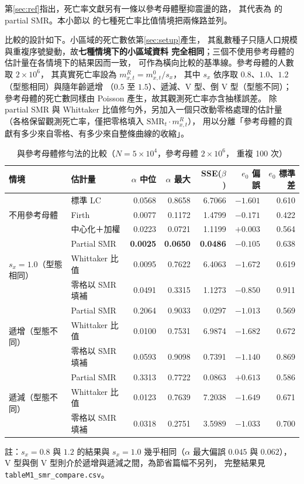 \documentclass[UTF8, fontset=macnew, a4paper, 12pt]{ctexart}
\begin{document}
第\ref{sec:ref}指出，死亡率文獻另有一條以參考母體壓抑震盪的路，
其代表為 \citet{lee2003}的 partial SMR。本小節以 \citet[Figure 2]{yue2019}
的七種死亡率比值情境把兩條路並列。

比較的設計如下。小區域的死亡數依第\ref{sec:setup}產生，
其亂數種子只隨人口規模與重複序號變動，故\textbf{七種情境下的小區域資料
完全相同}；三個不使用參考母體的估計量在各情境下的結果因而一致，
可作為橫向比較的基準線。參考母體的人數取 $2\times10^{6}$，
其真實死亡率設為 $m^{R}_{x,t}=m^{0}_{x,t}/s_x$，
其中 $s_x$ 依序取 $0.8$、$1.0$、$1.2$（型態相同）與隨年齡遞增
（$0.5$ 至 $1.5$）、遞減、V 型、倒 V 型（型態不同）；
參考母體的死亡數同樣由 Poisson 產生，故其觀測死亡率亦含抽樣誤差。
除 partial SMR 與 Whittaker 比值修勻外，另加入一個只改動零格處理的估計量
（各格保留觀測死亡率，僅把零格填入 $\mathrm{SMR}_t\cdot m^{R}_{x,t}$），
用以分離「參考母體的貢獻有多少來自零格、有多少來自整條曲線的收縮」。

\begin{table}[H]
\centering
\caption{與參考母體修勻法的比較（$N=5\times10^4$，參考母體 $2\times10^6$，
重複 100 次）}
\small
\renewcommand{\arraystretch}{1.1}
\begin{tabular}{llrrrrr}
\toprule
情境 & 估計量 & $\alpha$ 中位 & $\alpha$ 最大 & SSE($\beta$) & $e_0$ 偏誤 & $e_0$ 標準差\\
\midrule
\multirow{3}{*}{不用參考母體}
 & 標準 LC        & 0.0568 & 0.8658 & 6.7066 & $-1.601$ & 0.610\\
 & Firth          & 0.0077 & 0.1172 & 1.4799 & $-0.171$ & 0.422\\
 & 中心化＋加權   & 0.0223 & 0.0721 & 1.1199 & $+0.003$ & 0.564\\
\midrule
\multirow{3}{*}{$s_x=1.0$（型態相同）}
 & Partial SMR    & \textbf{0.0025} & \textbf{0.0650} & \textbf{0.0486} & $-0.105$ & 0.638\\
 & Whittaker 比值 & 0.0095 & 0.7622 & 6.4063 & $-1.672$ & 0.619\\
 & 零格以 SMR 填補 & 0.0491 & 0.3315 & 1.1273 & $-0.850$ & 0.911\\
\midrule
\multirow{3}{*}{遞增（型態不同）}
 & Partial SMR    & 0.2064 & 0.9033 & 0.0297 & $-1.013$ & 0.569\\
 & Whittaker 比值 & 0.0100 & 0.7531 & 6.9874 & $-1.682$ & 0.672\\
 & 零格以 SMR 填補 & 0.0593 & 0.9098 & 0.7391 & $-1.140$ & 0.869\\
\midrule
\multirow{3}{*}{遞減（型態不同）}
 & Partial SMR    & 0.3313 & 0.7722 & 0.0863 & $+0.613$ & 0.586\\
 & Whittaker 比值 & 0.0123 & 0.7639 & 7.2038 & $-1.649$ & 0.671\\
 & 零格以 SMR 填補 & 0.0318 & 0.2751 & 3.5989 & $-1.033$ & 0.700\\
\bottomrule
\end{tabular}

\vspace{2pt}
\parbox{0.92\textwidth}{\footnotesize 註：$s_x=0.8$ 與 $1.2$ 的結果與
$s_x=1.0$ 幾乎相同（$\alpha$ 最大偏誤 $0.045$ 與 $0.062$），
V 型與倒 V 型則介於遞增與遞減之間，為節省篇幅不另列，
完整結果見 \texttt{tableM1\_smr\_compare.csv}。}
\label{tab:smr}
\end{table}
\end{document}
